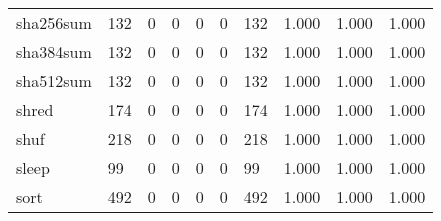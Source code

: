 \begin{longtable}{lp{2.0cm}p{2.0cm}p{2.0cm}p{2.0cm}p{2.0cm}p{2.0cm}p{2.0cm}p{2.0cm}p{2.0cm}}
sha256sum &                    132 &                                  0 &                                 0 &                                0 &                                 0 &                             132 &                                1.000 &                                  1.000 &                                1.000 \\
sha384sum &                    132 &                                  0 &                                 0 &                                0 &                                 0 &                             132 &                                1.000 &                                  1.000 &                                1.000 \\
sha512sum &                    132 &                                  0 &                                 0 &                                0 &                                 0 &                             132 &                                1.000 &                                  1.000 &                                1.000 \\
shred     &                    174 &                                  0 &                                 0 &                                0 &                                 0 &                             174 &                                1.000 &                                  1.000 &                                1.000 \\
shuf      &                    218 &                                  0 &                                 0 &                                0 &                                 0 &                             218 &                                1.000 &                                  1.000 &                                1.000 \\
sleep     &                     99 &                                  0 &                                 0 &                                0 &                                 0 &                              99 &                                1.000 &                                  1.000 &                                1.000 \\
sort      &                    492 &                                  0 &                                 0 &                                0 &                                 0 &                             492 &                                1.000 &                                  1.000 &                                1.000 \\

\end{longtable}
